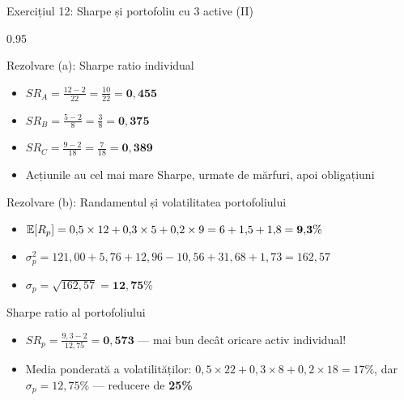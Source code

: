 \documentclass[9pt, aspectratio=169, t]{beamer}
\begin{document}
\begin{frame}[shrink=10]{Exercițiul 12: Sharpe și portofoliu cu 3 active (II)}
    \begin{cminipage}{0.95\textwidth}
    \begin{exampleblock}{Rezolvare (a): Sharpe ratio individual}
    \begin{itemize}\setlength{\itemsep}{0pt}
        \item $SR_A = \frac{12 - 2}{22} = \frac{10}{22} = \mathbf{0{,}455}$
        \item $SR_B = \frac{5 - 2}{8} = \frac{3}{8} = \mathbf{0{,}375}$
        \item $SR_C = \frac{9 - 2}{18} = \frac{7}{18} = \mathbf{0{,}389}$
        \item Acțiunile au cel mai mare Sharpe, urmate de mărfuri, apoi obligațiuni
    \end{itemize}
    \end{exampleblock}
    \vspace{0.1cm}
    \begin{exampleblock}{Rezolvare (b): Randamentul și volatilitatea portofoliului}
    \begin{itemize}\setlength{\itemsep}{0pt}
        \item $\mathbb{E}[R_p] = 0{,}5 \times 12 + 0{,}3 \times 5 + 0{,}2 \times 9 = 6 + 1{,}5 + 1{,}8 = \mathbf{9{,}3\%}$
        \item $\sigma_p^2 = 121{,}00 + 5{,}76 + 12{,}96 - 10{,}56 + 31{,}68 + 1{,}73 = 162{,}57$
        \item $\sigma_p = \sqrt{162{,}57} = \mathbf{12{,}75\%}$
    \end{itemize}
    \end{exampleblock}
    \begin{alertblock}{Sharpe ratio al portofoliului}
    \begin{itemize}\setlength{\itemsep}{0pt}
        \item $SR_p = \frac{9{,}3 - 2}{12{,}75} = \mathbf{0{,}573}$ --- mai bun decât oricare activ individual!
        \item Media ponderată a volatilităților: $0{,}5 \times 22 + 0{,}3 \times 8 + 0{,}2 \times 18 = 17\%$, dar $\sigma_p = 12{,}75\%$ --- reducere de \textbf{25\%}
    \end{itemize}
    \end{alertblock}
    \end{cminipage}
\end{frame}
\end{document}
